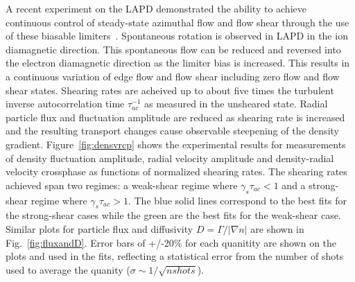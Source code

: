 \documentclass[aip,pop,amsmath,amssymb,reprint,superscriptaddress]{revtex4-1} %
\begin{document}
A recent experiment on the LAPD demonstrated the ability to achieve continuous control of steady-state azimuthal flow and flow shear through the use of these biasable limiters~\cite{schaffner12}. Spontaneous rotation is observed in LAPD in the ion diamagnetic direction.  This spontaneous flow can be reduced and reversed into the  electron diamagnetic direction as the limiter bias is increased. This results in a continuous variation of edge flow and flow shear including zero flow and flow shear states. Shearing rates are acheived up to about five times the turbulent inverse autocorrelation time  $\tau_{ac}^{-1}$ as measured in the unsheared state. Radial particle flux and fluctuation amplitude are reduced as shearing rate is increased and the resulting transport changes cause observable steepening of the density gradient. Figure~\ref{fig:densvrcp} shows the experimental results for measurements of density fluctuation amplitude, radial velocity amplitude and density-radial velocity crossphase as functions of normalized shearing rates. The shearing rates achieved span two regimes: a weak-shear regime where $\gamma_{s}\tau_{ac} < 1$ and a strong-shear regime where $\gamma_{s}\tau_{ac} > 1$. The blue solid lines correspond to the best fits for the strong-shear cases while the green are the best fits for the weak-shear case.  Similar plots for particle flux and diffusivity $D = \Gamma/|\nabla n|$ are shown in Fig.~\ref{fig:fluxandD}.  Error bars of +/-20\% for each quanitity are shown on the plots and used in the fits, reflecting a statistical error from the number of shots used to average the quanity ($\sigma \sim 1/\sqrt{nshots}$).
\end{document}
